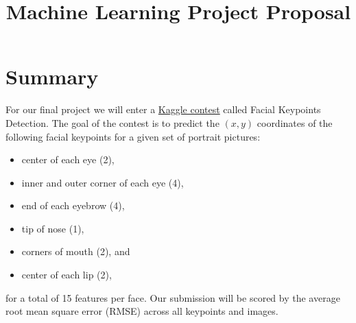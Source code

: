 \documentclass[conference]{IEEEtran}
\begin{document}
\title{Machine Learning Project Proposal}
\author{
\and
{}
}

\maketitle

\section{Summary}
For our final project we will enter a \href{https://www.kaggle.com/c/facial-keypoints-detection}{Kaggle contest} called Facial Keypoints Detection. The goal of the contest is to predict the $(x,y)$ coordinates of the following facial keypoints for a given set of portrait pictures:
\begin{itemize}
    \item center of each eye (2),
    \item inner and outer corner of each eye (4),
    \item end of each eyebrow (4),
    \item tip of nose (1),
    \item corners of mouth (2), and
    \item center of each lip (2),
\end{itemize}
for a total of 15 features per face. Our submission will be scored by the average root mean square error (RMSE) across all keypoints and images.
\end{document}
